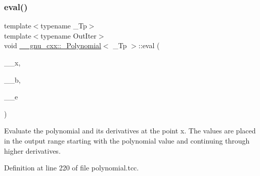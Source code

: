 \subsubsection{\texorpdfstring{eval()}{eval()}\hspace{0.1cm}{\footnotesize\ttfamily [2/4]}}
{\footnotesize\ttfamily template$<$typename \+\_\+\+Tp$>$ \\
template$<$typename Out\+Iter$>$ \\
void \hyperlink{class____gnu__cxx_1_1__Polynomial}{\+\_\+\+\_\+gnu\+\_\+cxx\+::\+\_\+\+Polynomial}$<$ \+\_\+\+Tp $>$\+::eval (\begin{DoxyParamCaption}\item[{typename \hyperlink{class____gnu__cxx_1_1__Polynomial}{\+\_\+\+Polynomial}$<$ \+\_\+\+Tp $>$\+::\hyperlink{class____gnu__cxx_1_1__Polynomial_a725563351f50e76084a7a016c06f8a53}{value\+\_\+type}}]{\+\_\+\+\_\+x,  }\item[{Out\+Iter}]{\+\_\+\+\_\+b,  }\item[{Out\+Iter}]{\+\_\+\+\_\+e }\end{DoxyParamCaption})}

Evaluate the polynomial and its derivatives at the point x. The values are placed in the output range starting with the polynomial value and continuing through higher derivatives. 

Definition at line 220 of file polynomial.\+tcc.


